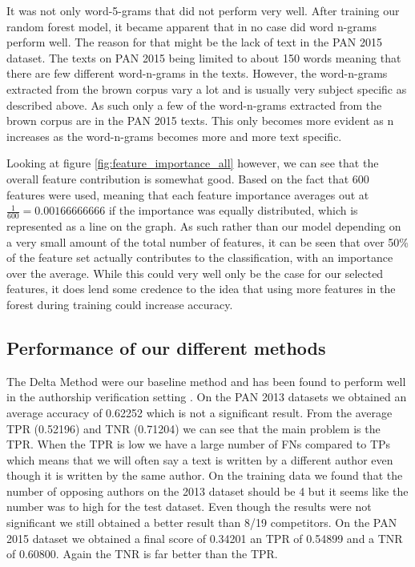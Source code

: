 It was not only word-5-grams that did not perform very well. After training our
random forest model, it became apparent that in no case did word n-grams perform
well. The reason for that might be the lack of text in the PAN 2015 dataset. The
texts on PAN 2015 being limited to about 150 words meaning that there are few
different word-n-grams in the texts. However, the word-n-grams extracted from
the brown corpus vary a lot and is usually very subject specific as described
above. As such only a few of the word-n-grams extracted from the brown corpus
are in the PAN 2015 texts. This only becomes more evident as n increases as the
word-n-grams becomes more and more text specific.

Looking at figure \ref{fig:feature_importance_all} however, we can see that
the overall feature contribution is somewhat good. Based on the fact that
600 features were used, meaning that each feature importance averages out at
$\frac{1}{600} = 0.00166666666$ if the importance was equally distributed, which
is represented as a line on the graph. As such rather than our model depending
on a very small amount of the total number of features, it can be seen that
over 50\% of the feature set actually contributes to the classification, with
an importance over the average. While this could very well only be the case for
our selected features, it does lend some credence to the idea that using more
features in the forest during training could increase accuracy.

\subsection{Performance of our different methods}

The Delta Method were our baseline method and has been found to perform well in
the authorship verification setting \cite{evert2015towards}. On the PAN 2013
datasets we obtained an average accuracy of 0.62252 which is not a significant
result. From the average \gls{TPR} (0.52196) and \gls{TNR} (0.71204) we can see
that the main problem is the \gls{TPR}. When the \gls{TPR} is low we have a
large number of \gls{FN}s compared to \gls{TP}s which means that we will often
say a text is written by a different author even though it is written by the
same author. On the training data we found that the number of opposing authors
on the 2013 dataset should be 4 but it seems like the number was to high for the
test dataset. Even though the results were not significant we still obtained a
better result than 8/19 competitors. On the PAN 2015 dataset we obtained a final
score of 0.34201 an \gls{TPR} of 0.54899 and a \gls{TNR} of 0.60800. Again the
\gls{TNR} is far better than the \gls{TPR}.

